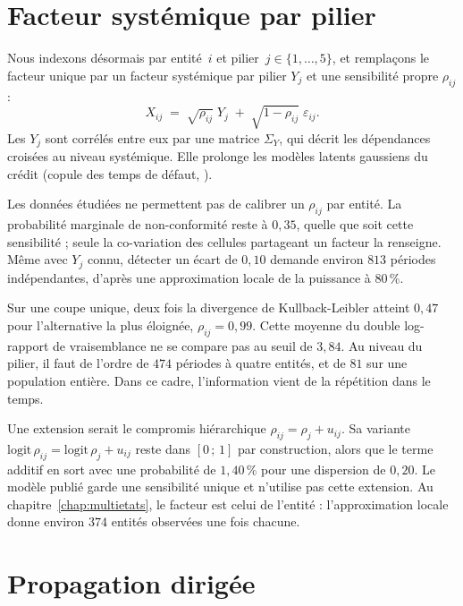 
\section{Facteur systémique par pilier}

Nous indexons désormais par entité~$i$ et pilier~$j\in\{1,\dots,5\}$, et remplaçons le facteur
unique par un facteur systémique par pilier $Y_j$ et une sensibilité propre $\rho_{ij}$ :
\begin{equation}
X_{ij} \;=\; \sqrt{\rho_{ij}}\;Y_j \;+\; \sqrt{1-\rho_{ij}}\;\varepsilon_{ij}.
\end{equation}
Les $Y_j$ sont corrélés entre eux par une matrice $\Sigma_Y$, qui décrit les dépendances croisées
au niveau systémique. Elle prolonge les modèles latents gaussiens du crédit (copule des temps de défaut, \citet{Li2000}).

Les données étudiées ne permettent pas de calibrer un $\rho_{ij}$ par entité. La probabilité marginale de non-conformité reste
à $0{,}35$, quelle que soit cette sensibilité ; seule la co-variation des cellules partageant un facteur la renseigne.
Même avec $Y_j$ connu, détecter un écart de $0{,}10$ demande environ $813$ périodes indépendantes,
d'après une approximation locale de la puissance à $80\,\%$.

Sur une coupe unique, deux fois la divergence de Kullback-Leibler atteint $0{,}47$ pour l'alternative la plus éloignée, $\rho_{ij}=0{,}99$.
Cette moyenne du double log-rapport de vraisemblance ne se compare pas au seuil de $3{,}84$.
Au niveau du pilier, il faut de l'ordre de $474$ périodes à quatre entités, et de $81$ sur une population entière.
Dans ce cadre, l'information vient de la répétition dans le temps.

Une extension serait le compromis hiérarchique $\rho_{ij}=\rho_j+u_{ij}$. Sa variante
$\mathrm{logit}\,\rho_{ij}=\mathrm{logit}\,\rho_j+u_{ij}$ reste dans $[0\,;\,1]$ par construction,
alors que le terme additif en sort avec une probabilité de $1{,}40\,\%$ pour une dispersion de
$0{,}20$. Le modèle publié garde une sensibilité unique et n'utilise pas cette extension.
Au chapitre~\ref{chap:multietats}, le facteur est celui de l'entité : l'approximation locale donne environ $374$ entités observées une fois chacune.


\section{Propagation dirigée}
\label{sec:baremes}


